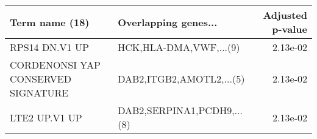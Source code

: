 \begin{tabular}{llr}
\toprule
                    Term name (18) &       Overlapping genes... &  Adjusted p-value \\
\midrule
                    RPS14 DN.V1 UP &     HCK,HLA-DMA,VWF,...(9) &          2.13e-02 \\
CORDENONSI YAP CONSERVED SIGNATURE &   DAB2,ITGB2,AMOTL2,...(5) &          2.13e-02 \\
                     LTE2 UP.V1 UP & DAB2,SERPINA1,PCDH9,...(8) &          2.13e-02 \\
\bottomrule
\end{tabular}
